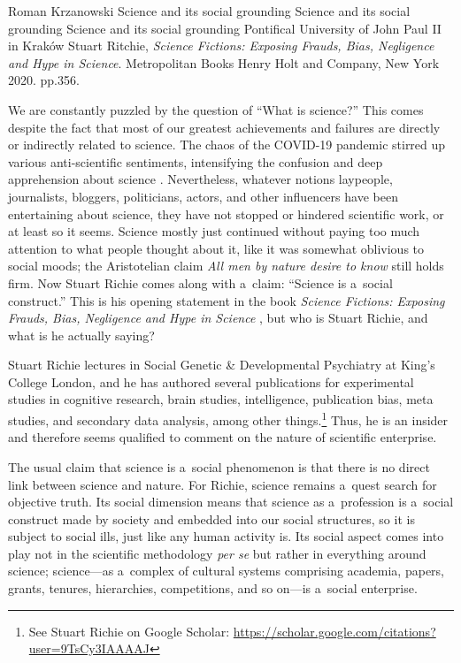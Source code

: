 \begin{newrevengenv}{Roman Krzanowski}
	{Science and its social grounding}
	{Science and its social grounding}
	{Science and its social grounding}
	{Pontifical University of John Paul II in Kraków}
	{Stuart Ritchie, \textit{Science Fictions: Exposing Frauds, Bias, Negligence and Hype in Science}. Metropolitan Books Henry Holt and Company, New York 2020. pp.356.}





\lettrine[loversize=0.13,lines=2,lraise=-0.01,nindent=0em,findent=0.2pt]%
{W}{}e are constantly puzzled by the question of ``What is science?'' This comes despite the fact that most of our greatest achievements and failures are directly or indirectly related to science. The chaos of the COVID-19 pandemic stirred up various anti-scientific sentiments, intensifying the confusion and deep apprehension about science
\parencite[see e.g.][]{blaylock_covid_2022}. %
 Nevertheless, whatever notions laypeople, journalists, bloggers, politicians, actors, and other influencers have been entertaining about science, they have not stopped or hindered scientific work, or at least so it seems. Science mostly just continued without paying too much attention to what people thought about it, like it was somewhat oblivious to social moods; the Aristotelian claim \textit{All men by nature desire to know} still holds firm. Now Stuart Richie comes along with a~claim: ``Science is a~social construct.'' This is his opening statement in the book \textit{Science Fictions: Exposing Frauds, Bias, Negligence and Hype in Science} 
\parencite*[][]{ritchie_science_2020}, %
 but who is Stuart Richie, and what is he actually saying?

Stuart Richie lectures in Social Genetic \& Developmental Psychiatry at King's College London, and he has authored several publications for experimental studies in cognitive research, brain studies, intelligence, publication bias, meta studies, and secondary data analysis, among other things.\footnote{See Stuart Richie on Google Scholar: \url{https://scholar.google.com/citations?user=9TsCy3IAAAAJ}} Thus, he is an insider and therefore seems qualified to comment on the nature of scientific enterprise.

The usual claim that science is a~social phenomenon
\parencites*[see e.g.][]{bloor_knowledge_1976}[][]{bloor_knowledge_1991}[][]{mackenzie_notes_1981}[][]{longino_social_2002} %
 is that there is no direct link between science and nature. For Richie, science remains a~quest search for objective truth. Its social dimension means that science as a~profession is a~social construct made by society and embedded into our social structures, so it is subject to social ills, just like any human activity is. Its social aspect comes into play not in the scientific methodology \textit{per se} but rather in everything around science; science—as a~complex of cultural systems comprising academia, papers, grants, tenures, hierarchies, competitions, and so on—is a~social enterprise.


\end{newrevengenv}
